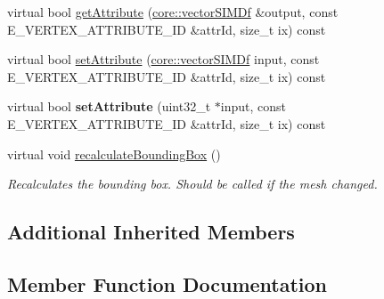 \begin{DoxyCompactItemize}
\item 
virtual bool \hyperlink{classirr_1_1scene_1_1ICPUMeshBuffer_a6d971fdaf4537e249a9ed849b72e0377}{get\+Attribute} (\hyperlink{classirr_1_1core_1_1vectorSIMDf}{core\+::vector\+S\+I\+M\+Df} \&output, const E\+\_\+\+V\+E\+R\+T\+E\+X\+\_\+\+A\+T\+T\+R\+I\+B\+U\+T\+E\+\_\+\+ID \&attr\+Id, size\+\_\+t ix) const 
\item 
virtual bool \hyperlink{classirr_1_1scene_1_1ICPUMeshBuffer_a09de5f90f3abd1fab782551015d3af44}{set\+Attribute} (\hyperlink{classirr_1_1core_1_1vectorSIMDf}{core\+::vector\+S\+I\+M\+Df} input, const E\+\_\+\+V\+E\+R\+T\+E\+X\+\_\+\+A\+T\+T\+R\+I\+B\+U\+T\+E\+\_\+\+ID \&attr\+Id, size\+\_\+t ix) const 
\item 
virtual bool {\bfseries set\+Attribute} (uint32\+\_\+t $\ast$input, const E\+\_\+\+V\+E\+R\+T\+E\+X\+\_\+\+A\+T\+T\+R\+I\+B\+U\+T\+E\+\_\+\+ID \&attr\+Id, size\+\_\+t ix) const \hypertarget{classirr_1_1scene_1_1ICPUMeshBuffer_ac680f86f70345c4216cd639115901a78}{}\label{classirr_1_1scene_1_1ICPUMeshBuffer_ac680f86f70345c4216cd639115901a78}

\item 
virtual void \hyperlink{classirr_1_1scene_1_1ICPUMeshBuffer_af7950e5b319d74c646c396b073fd78bf}{recalculate\+Bounding\+Box} ()\hypertarget{classirr_1_1scene_1_1ICPUMeshBuffer_af7950e5b319d74c646c396b073fd78bf}{}\label{classirr_1_1scene_1_1ICPUMeshBuffer_af7950e5b319d74c646c396b073fd78bf}

\begin{DoxyCompactList}\small\item\em Recalculates the bounding box. Should be called if the mesh changed. \end{DoxyCompactList}\end{DoxyCompactItemize}
\subsection*{Additional Inherited Members}


\subsection{Member Function Documentation}
